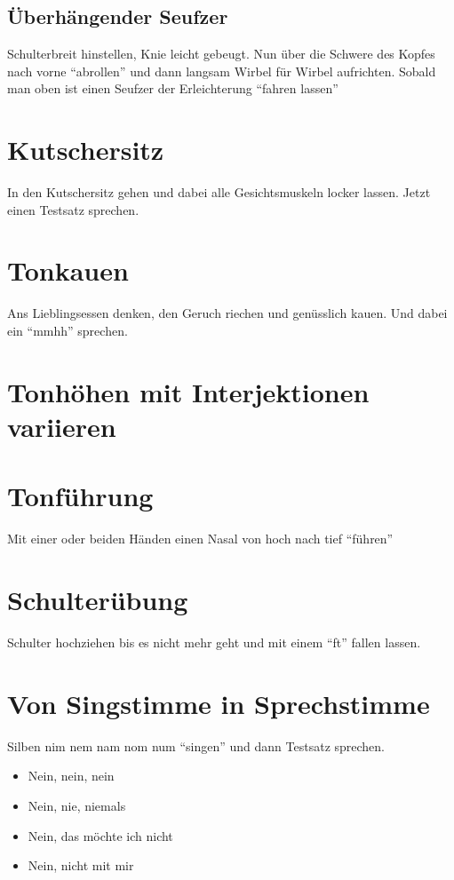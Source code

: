 \documentclass[ngerman, a4paper, twoside]{scrbook}%
\begin{document}
		\subsection{Überhängender Seufzer}
		Schulterbreit hinstellen, Knie leicht gebeugt. Nun über die Schwere des Kopfes nach vorne "`abrollen"' und dann langsam Wirbel für Wirbel aufrichten. Sobald man oben ist einen Seufzer der Erleichterung "`fahren lassen"'

	\section{Kutschersitz}
	In den Kutschersitz gehen und dabei alle Gesichtsmuskeln locker lassen. Jetzt einen Testsatz sprechen.

	\section{Tonkauen}
	Ans Lieblingsessen denken, den Geruch riechen und genüsslich kauen. Und dabei ein "`mmhh"' sprechen.

	\section{Tonhöhen mit Interjektionen variieren}

	\section{Tonführung}
	Mit einer oder beiden Händen einen Nasal von hoch nach tief "`führen"'

	\section{Schulterübung}
	Schulter hochziehen bis es nicht mehr geht und mit einem "`ft"' fallen lassen.

	\section{Von Singstimme in Sprechstimme}
	Silben nim nem nam nom num "`singen"' und dann Testsatz sprechen.
	\begin{itemize}
		\item Nein, nein, nein
		\item Nein, nie, niemals
		\item Nein, das möchte ich nicht
		\item Nein, nicht mit mir
	\end{itemize}
\end{document}
